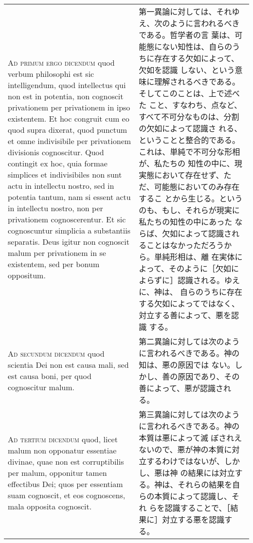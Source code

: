\documentclass[10pt]{jsarticle} %
\begin{document}
\begin{longtable}{p{21em}p{21em}}
\\


{\scshape Ad primum ergo dicendum} quod verbum
philosophi est sic intelligendum, quod intellectus qui non est in
potentia, non cognoscit privationem per privationem in ipso
existentem. Et hoc congruit cum eo quod supra dixerat, quod punctum et
omne indivisibile per privationem divisionis cognoscitur. Quod contingit
ex hoc, quia formae simplices et indivisibiles non sunt actu in
intellectu nostro, sed in potentia tantum, nam si essent actu in
intellectu nostro, non per privationem cognoscerentur. Et sic
cognoscuntur simplicia a substantiis separatis. Deus igitur non
cognoscit malum per privationem in se existentem, sed per bonum
oppositum.

&

第一異論に対しては、それゆえ、次のように言われるべきである。哲学者の言
葉は、可能態にない知性は、自らのうちに存在する欠如によって、欠如を認識
しない、という意味に理解されるべきである。そしてこのことは、上で述べた
こと、すなわち、点など、すべて不可分なものは、分割の欠如によって認識さ
れる、ということと整合的である。これは、単純で不可分な形相が、私たちの
知性の中に、現実態において存在せず、ただ、可能態においてのみ存在するこ
とから生じる。というのも、もし、それらが現実に私たちの知性の中にあった
ならば、欠如によって認識されることはなかっただろうから。単純形相は、離
在実体によって、そのように［欠如によらずに］認識される。ゆえに、神は、
自らのうちに存在する欠如によってではなく、対立する善によって、悪を認識
する。

\\


{\scshape Ad secundum dicendum} quod scientia Dei non
est causa mali, sed est causa boni, per quod cognoscitur malum.

&

第二異論に対しては次のように言われるべきである。神の知は、悪の原因では
ない。しかし、善の原因であり、その善によって、悪が認識される。

\\


{\scshape Ad tertium dicendum} quod, licet malum non
opponatur essentiae divinae, quae non est corruptibilis per malum,
opponitur tamen effectibus Dei; quos per essentiam suam cognoscit, et
eos cognoscens, mala opposita cognoscit.

&

第三異論に対しては次のように言われるべきである。神の本質は悪によって滅
ぼされえないので、悪が神の本質に対立するわけではないが、しかし、悪は神
の結果には対立する。神は、それらの結果を自らの本質によって認識し、それ
らを認識することで、［結果に］対立する悪を認識する。


\end{longtable}
\end{document}
